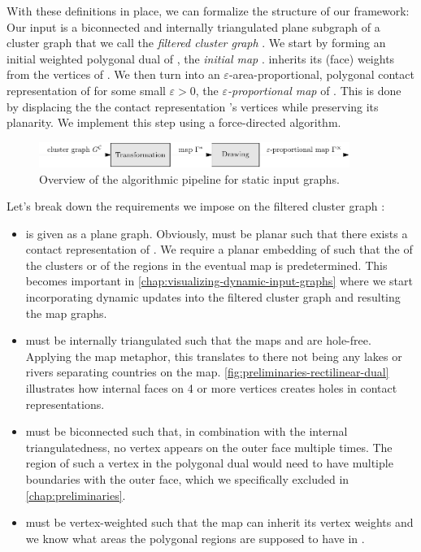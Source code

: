 With these definitions in place, we can formalize the structure of our framework:
Our input is a biconnected and internally triangulated plane subgraph of a cluster graph that we call the \emph{filtered cluster graph} \clustergraph{}.
We start by forming an initial weighted polygonal dual of \clustergraph{}, the \emph{initial map} \initmap{}.
\initmap{} inherits its (face) weights from the vertices of \clustergraph{}.
We then turn \initmap{} into an $\varepsilon$-area-proportional, polygonal contact representation of \clustergraph{} for some small $\varepsilon > 0$, the \emph{$\varepsilon$-proportional map} \propmap{} of \clustergraph{}.
This is done by displacing the the contact representation \initmap{}'s vertices while preserving its planarity.
We implement this step using a force-directed algorithm.

\begin{figure}[H]
	\centering\includegraphics[width=0.9\textwidth]{Resources/Framework-1.pdf}
	\caption{Overview of the algorithmic pipeline for static input graphs.}
	\label{fig:static-pipeline-thesis}
\end{figure}

Let's break down the requirements we impose on the filtered cluster graph \clustergraph{}:

\begin{itemize}
\item \clustergraph{} is given as a plane graph.
Obviously, \clustergraph{} must be planar such that there exists a contact representation of \clustergraph{}.
We require a planar embedding of \clustergraph{} such that the  of the clusters or of the regions in the eventual map is predetermined.
This becomes important in \cref{chap:visualizing-dynamic-input-graphs} where we start incorporating dynamic updates into the filtered cluster graph and resulting the map graphs.
\item \clustergraph{} must be internally triangulated such that the maps \initmap{} and \propmap{} are hole-free.
Applying the map metaphor, this translates to there not being any lakes or rivers separating countries on the map.
\cref{fig:preliminaries-rectilinear-dual} illustrates how internal faces on 4 or more vertices creates holes in contact representations.
\item \clustergraph{} must be biconnected such that, in combination with the internal triangulatedness, no vertex appears on the outer face multiple times.
The region of such a vertex in the polygonal dual would need to have multiple boundaries with the outer face, which we specifically excluded in \cref{chap:preliminaries}.
\item \clustergraph{} must be vertex-weighted such that the map \initmap{} can inherit its vertex weights and we know what areas the polygonal regions are supposed to have in \propmap{}.
\end{itemize}

